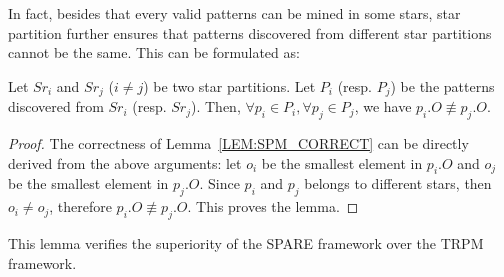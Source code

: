 In fact, besides that every valid patterns can be
mined in some stars, star partition further ensures
that patterns discovered
from different star partitions cannot be the same. 
This can be formulated as:

\begin{lemma}
\label{LEM:SPM_CORRECT}
Let $Sr_i$ and $Sr_j$ ($i\neq j$) be two star partitions. Let $P_i$ (resp. $P_j$) be 
the patterns discovered from $Sr_i$ (resp. $Sr_j$). 
Then, $\forall p_i \in P_i, \forall p_j \in P_j$, we have $p_i.O \not\equiv p_j.O$.
\end{lemma}
\begin{proof}
The correctness of Lemma~\ref{LEM:SPM_CORRECT} can be directly derived from the above arguments:
let $o_i$ be the smallest element in $p_i.O$ and $o_j$ be the smallest element in $p_j.O$. 
Since $p_i$ and $p_j$ belongs to different stars, then $o_i \neq o_j$, 
therefore $p_i.O \not\equiv p_j.O$. This proves the lemma.
\end{proof}

This lemma verifies the superiority of the SPARE framework over the TRPM framework.

